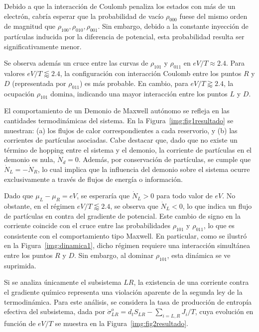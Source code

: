 Debido a que la interacción de Coulomb penaliza los estados con más de un electrón, cabría esperar que la probabilidad de vacío $\rho_{000}$ fuese del mismo orden de magnitud que $\rho_{100},\rho_{010},\rho_{001}$. Sin embargo, debido a la constante inyección de partículas inducida por la diferencia de potencial, esta probabilidad resulta ser significativamente menor. 

Se observa además un cruce entre las curvas de $\rho_{101}$ y $\rho_{011}$ en $eV/T \approx 2.4$. Para valores $eV/T \lessapprox 2.4$, la configuración con interacción Coulomb entre los puntos $R$ y $D$ (representada por $\rho_{011}$) es más probable. En cambio, para $eV/T \gtrapprox 2.4$, la ocupación $\rho_{101}$ domina, indicando una mayor interacción entre los puntos $L$ y $D$.



El comportamiento de un Demonio de Maxwell autónomo se refleja en las cantidades termodinámicas del sistema. En la Figura~\ref{img:fig1resultado} se muestran: (a) los flujos de calor correspondientes a cada reservorio, y (b) las corrientes de partículas asociadas. Cabe destacar que, dado que no existe un término de hopping entre el sistema y el demonio, la corriente de partículas en el demonio es nula, $\dot{N}_{d} = 0$. Además, por conservación de partículas, se cumple que $\dot{N}_{L} = -\dot{N}_{R}$, lo cual implica que la influencia del demonio sobre el sistema ocurre exclusivamente a través de flujos de energía o información.

Dado que $\mu_L - \mu_R = eV$, se esperaría que $\dot{N}_L > 0$ para todo valor de $eV$. No obstante, en el régimen $eV/T \lessapprox 2.4$, se observa que $\dot{N}_L < 0$, lo que indica un flujo de partículas en contra del gradiente de potencial. Este cambio de signo en la corriente coincide con el cruce entre las probabilidades $\rho_{101}$ y $\rho_{011}$, lo que es consistente con el comportamiento tipo Maxwell. En particular, como se ilustró en la Figura~\ref{img:dinamica1}, dicho régimen requiere una interacción simultánea entre los puntos $R$ y $D$. Sin embargo, al dominar $\rho_{101}$, esta dinámica se ve suprimida.

Si se analiza únicamente el subsistema $LR$, la existencia de una corriente contra el gradiente químico representa una violación aparente de la segunda ley de la termodinámica. Para este análisis, se considera la tasa de producción de entropía efectiva del subsistema, dada por $\dot{\sigma}^{o}_{LR} = d_{t}S_{LR} - \sum_{i=L,R} J_i/T$, cuya evolución en función de $eV/T$ se muestra en la Figura~\ref{img:fig2resultado}.


